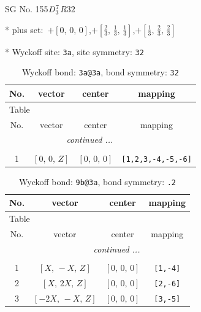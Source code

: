 \documentclass[fleqn,8pt]{jsarticle}
\begin{document}
\setcounter{MaxMatrixCols}{32}

\renewcommand{\tablename}{Table~}
\renewcommand{\figurename}{Figure~}
\begin{center}
\LARGE
SG No. 155\quad$D_{\rm 3}^{7}$\quad$R32$\quad[ trigonal ]
\end{center}

* plus set:\,\,\,$+\left[ 0,\, 0,\, 0 \right]$,\quad $+\left[ \frac{2}{3},\, \frac{1}{3},\, \frac{1}{3} \right]$,\quad $+\left[ \frac{1}{3},\, \frac{2}{3},\, \frac{2}{3} \right]$


* Wyckoff site: {\tt 3a}, site symmetry: {\tt 32}
\renewcommand{\arraystretch}{1.2}
\begin{longtable}{cccc}
\caption{Wyckoff bond: {\tt 3a@3a}, bond symmetry: {\tt 32}}
 \\
 \hline \hline
No. & vector & center & mapping \\ \hline \endfirsthead

\multicolumn{3}{l}{\tablename\ \thetable{}} \\
 \hline \hline
No. & vector & center & mapping \\ \hline \endhead

 \hline \hline
\multicolumn{3}{r}{\footnotesize\it continued ...} \\ \endfoot

 \hline \hline
\multicolumn{3}{r}{} \\ \endlastfoot

1 & $\left[ 0,\, 0,\, Z \right]$ & $\left[ 0,\, 0,\, 0 \right]$ & {\tt [1,2,3,-4,-5,-6]} \\
\end{longtable}
\renewcommand{\arraystretch}{1.2}
\begin{longtable}{cccc}
\caption{Wyckoff bond: {\tt 9b@3a}, bond symmetry: {\tt .2}}
 \\
 \hline \hline
No. & vector & center & mapping \\ \hline \endfirsthead

\multicolumn{3}{l}{\tablename\ \thetable{}} \\
 \hline \hline
No. & vector & center & mapping \\ \hline \endhead

 \hline \hline
\multicolumn{3}{r}{\footnotesize\it continued ...} \\ \endfoot

 \hline \hline
\multicolumn{3}{r}{} \\ \endlastfoot

1 & $\left[ X,\, - X,\, Z \right]$ & $\left[ 0,\, 0,\, 0 \right]$ & {\tt [1,-4]} \\ \hline
2 & $\left[ X,\, 2 X,\, Z \right]$ & $\left[ 0,\, 0,\, 0 \right]$ & {\tt [2,-6]} \\ \hline
3 & $\left[ - 2 X,\, - X,\, Z \right]$ & $\left[ 0,\, 0,\, 0 \right]$ & {\tt [3,-5]} \\
\end{longtable}
\end{document}
